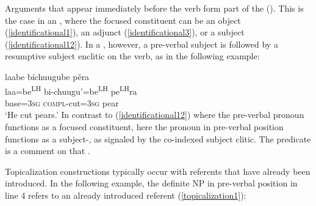 Arguments that appear immediately before the verb form part of the  (). This is the case in an , where the focused constituent can be an object (\ref{identificational1}), an adjunct (\ref{identificational3}), or a subject (\ref{identificational12}). In a , however, a pre-verbal subject is followed by a resumptive subject enclitic on the verb, as in the following example:

\ea\label{topicalization}
\glll laabe b\'{i}chuugube p\v{e}ra  \\
laa=be\textsuperscript{LH} bi-chuugu'=be\textsuperscript{LH} pe\textsuperscript{LH}ra  \\
base=\textsc{3sg} \textsc{compl}-cut=\textsc{3sg} pear  \\
\glt `He cut pears.' 
\z
In contrast to (\ref{identificational12}) where the pre-verbal pronoun functions as a focused constituent, here the pronoun in pre-verbal position functions as a subject-, as signaled by the co-indexed subject clitic. The predicate is a comment on that . 

Topicalization constructions typically occur with referents that have already been introduced. In the following example, the definite NP in pre-verbal position in line 4 refers to an already introduced referent (\ref{topicalization1}):

